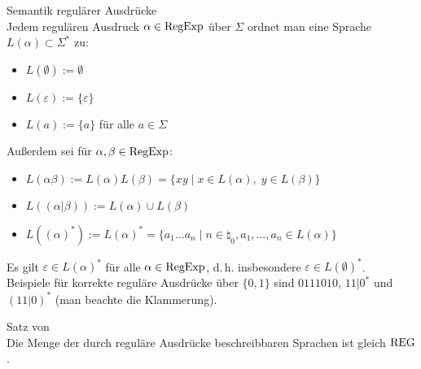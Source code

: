 \begin{Def}{Semantik regulärer Ausdrücke}\\
    Jedem regulären Ausdruck $\alpha \in \text{RegExp}$ über $\Sigma$ ordnet man eine
    Sprache $L(\alpha) \subset \Sigma^\ast$ zu:
    \begin{itemize}
        \item
        $L(\emptyset) := \emptyset$
        
        \item
        $L(\varepsilon) := \{\varepsilon\}$
        
        \item
        $L(a) := \{a\}$ für alle $a \in \Sigma$
    \end{itemize}
    Außerdem sei für $\alpha, \beta \in \text{RegExp}$:
    \begin{itemize}
        \item
        $L(\alpha \beta) := L(\alpha) L(\beta) =
        \{xy \;|\; x \in L(\alpha),\; y \in L(\beta)\}$
        
        \item
        $L((\alpha|\beta)) := L(\alpha) \cup L(\beta)$
        
        \item
        $L((\alpha)^\ast) := L(\alpha)^\ast =
        \{a_1 \dotsc a_n \;|\; n \in \natural_0,
        a_1, \dotsc, a_n \in L(\alpha)\}$
    \end{itemize}
\end{Def}

\begin{Bem}
    Es gilt $\varepsilon \in L(\alpha)^\ast$ für alle $\alpha \in \text{RegExp}$,
    d.\,h. insbesondere $\varepsilon \in L(\emptyset)^\ast$.\\
    Beispiele für korrekte reguläre Ausdrücke über $\{0, 1\}$ sind
    $0111010$, $11|0^\ast$ und $(11|0)^\ast$ (man beachte die Klammerung).
\end{Bem}

\linie
\pagebreak

\begin{Satz}{Satz von \upshape\,\!}\\
    Die Menge der durch reguläre Ausdrücke beschreibbaren Sprachen ist gleich
    $\text{REG}$.
\end{Satz}

